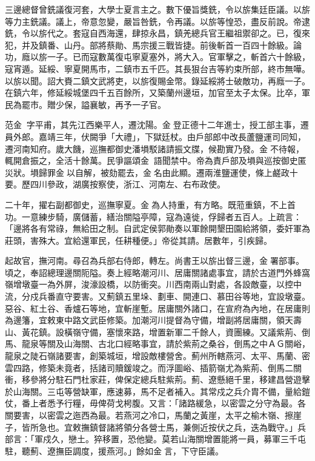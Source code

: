 \begin{pinyinscope}
三邊總督曾銑議復河套，大學士夏言主之。數下優旨獎銑，令以旂集廷臣議。以旂等力主銑議。議上，帝意忽變，嚴旨咎銑，令再議。以旂等惶恐，盡反前說。帝逮銑，令以旂代之。套寇自西海還，肆掠永昌，鎮羌總兵官王繼祖禦卻之。已，復來犯，并及鎮番、山丹。部將蔡勛、馬宗援三戰皆捷。前後斬首一百四十餘級。論功，廕以旂一子。已而寇數萬復屯寧夏塞外，將大入。官軍擊之，斬首六十餘級，寇宵遁。延綏、寧夏開馬市，二鎮市五千匹。其長狠台吉等約束所部，終市無嘩。以旂以聞。詔大賚二鎮文武將吏，以旂復賜金幣。錄延綏將士破敵功，再廕一子。在鎮六年，修延綏城堡四千五百餘所，又築蘭州邊垣，加官至太子太保。比卒，軍民為罷市。贈少保，謚襄敏，再予一子官。

范金，字平甫，其先江西樂平人，遷沈陽。金登正德十二年進士，授工部主事，遷員外郎。嘉靖三年，伏闕爭「大禮」，下獄廷杖。由戶部郎中改長蘆鹽運司同知，遷河南知府。歲大饑，巡撫都御史潘塤駁諸請振文牒，候勘實乃發。金不待報，輒開倉振之，全活十餘萬。民爭謳頌金，語聞禁中。帝為責戶部及塤與巡按御史匿災狀。塤歸罪金以自解，被劾罷去，金名由此顯。遷兩淮鹽運使，條上鹺政十要。歷四川參政，湖廣按察使，浙江、河南左、右布政使。

二十年，擢右副都御史，巡撫寧夏。金為人持重，有方略。既蒞重鎮，不上首功。一意練步騎，廣儲蓄，繕治關隘亭障，寇為遠徙，俘歸者五百人。上疏言：「邊將各有常祿，無給田之制。自武定侯郭勛奏以軍餘開墾田園給將領，委奸軍為莊頭，害殊大。宜給還軍民，任耕種便。」帝從其請。居數年，引疾歸。

起故官，撫河南。尋召為兵部右侍郎，轉左。尚書王以旂出督三邊，金署部事。頃之，奉詔總理邊關阨隘。奏上經略潮河川、居庸關諸處事宜，請於古道門外蜂窩嶺增墩臺一為外屏，浚濠設橋，以防衝突。川西南兩山對處，各設敵臺，以控中流，分戍兵番直守要害。又薊鎮五里垛、劃車、開連口、慕田谷等地，宜設墩臺。惡谷、紅土谷、香爐石等地，宜斬崖塹。居庸關外諸口，在宣府為內地，在居庸則為邊籓，宜敕東中路文武臣修築。加潮河川提督為守備，增副將居庸關，領天壽山、黃花鎮。設橫嶺守備，塞懷來路，增置新軍二千餘人，資團練。又議紫荊、倒馬、龍泉等關及山海關、古北口經略事宜，請於紫荊之桑谷，倒馬之中ＡＧ關峪，龍泉之陡石嶺諸要害，創築城垣，增設敵樓營舍。薊州所轄燕河、太平、馬蘭、密雲四路，修築未竟者，括諸司贖鍰竣之。而浮圖峪、插箭嶺尤為紫荊、倒馬二關衝，移參將分駐石門杜家莊，俾保定總兵駐紫荊。薊、遼懸絕千里，移建昌營遊擊於山海關。三屯等營缺軍，應速募，馬不足者補入。其常戍之兵介胄不備，量給鎧仗，番上者悉予行糧，毋俾荷戈枵腹。又言：「諸路緩急，以密雲之分守為最。各關要害，以密雲之迤西為最。若燕河之冷口，馬蘭之黃崖，太平之榆木嶺、擦崖子，皆所急也。宜敕撫鎮督諸將領分各營士馬，兼側近按伏之兵，迭為戰守。」兵部言：「軍戍久，戀土。猝移置，恐他變。莫若山海關增置能將一員，募軍三千屯駐，聽薊、遼撫臣調度，援燕河。」餘如金言，下守臣議。


\end{pinyinscope}
